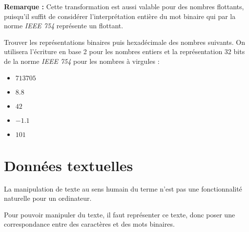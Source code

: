 \documentclass[../../main.tex]{subfiles}
\begin{document}
\textbf{Remarque :} Cette transformation est aussi valable pour des nombres flottants, puisqu'il suffit de considérer l'interprétation entière du mot binaire qui par la norme \textit{IEEE 754} représente un flottant.

\newline
Trouver les représentations binaires puis hexadécimale des nombres suivants. On utilisera l'écriture en base 2 pour les nombres entiers et la représentation 32 bits de la norme \textit{IEEE 754} pour les nombres à virgules :
\begin{itemize}
     \item $713705$
     \item $8.8$
     \item $42$
     \item $-1.1$
     \item $101$
\end{itemize}
\section{Données textuelles}
La manipulation de texte au sens humain du terme n'est pas une fonctionnalité naturelle pour un ordinateur.
 
Pour pouvoir manipuler du texte, il faut représenter ce texte, donc poser une correspondance entre des caractères et des mots binaires. 
\end{document}
